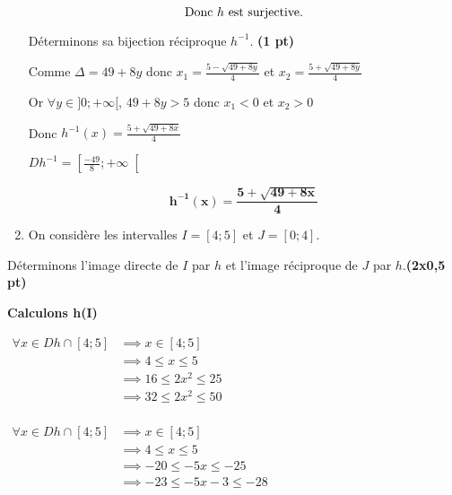 \documentclass[12pt,a4paper]{article}
\begin{document}
\begin{enumerate}
          \begin{resultbox}
            \[
                \mathbf{\text{Donc \( h \) est surjective.}}
            \]
        \end{resultbox}
   
   Déterminons sa bijection réciproque \( h^{-1} \). \hfill \textbf{(1 pt)}

   Comme \( \Delta = 49+8y \) donc \( x_{1} = \frac{5-\sqrt{49+8y}}{4} \) et \( x_{2} = \frac{5+\sqrt{49+8y}}{4} \) 

   Or \(\forall y \in ]0;+\infty[ \), \( 49+8y > 5 \) donc \( x_{1}<0 \) et \( x_{2}>0 \)

   Donc \( h^{-1}(x) = \frac{5+\sqrt{49+8x}}{4} \)
   
   \( Dh^{-1}=\left[\frac{-49}{8};+\infty\right[\)

   \begin{resultbox}
    \[
        \mathbf{ h^{-1}(x) = \frac{5+\sqrt{49+8x}}{4} }
    \]
    \end{resultbox}

   \item On considère les intervalles \( I = [4 ; 5] \) et \( J = [0 ; 4] \).
\end{enumerate}

Déterminons l’image directe de $I$ par $h$ et l’image réciproque de $J$ par $h$.\hfill \textbf{(2x0,5 pt)}

\textbf{Calculons h(I)}

\( 
\begin{aligned}
    \forall x \in Dh \cap [4 ; 5] &\implies x \in [4 ; 5] \\
                                &\implies 4 \leq x \leq 5 \\
                                &\implies 16 \leq 2x^{2} \leq 25 \\
                                &\implies 32 \leq 2x^{2} \leq 50 \\
\end{aligned} 
\) 

\( 
\begin{aligned}
    \forall x \in Dh \cap [4 ; 5] &\implies x \in [4 ; 5] \\
                                &\implies 4 \leq x \leq 5 \\
                                &\implies -20 \leq -5x \leq -25 \\
                                &\implies -23 \leq -5x -3 \leq -28 \\
\end{aligned} 
\) 
\end{document}
